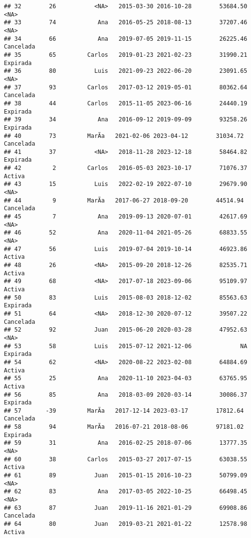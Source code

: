 \documentclass[
]{article}
\begin{document}
\begin{verbatim}
## 32        26           <NA>   2015-03-30 2016-10-28        53684.50      <NA>
## 33        74            Ana   2016-05-25 2018-08-13        37207.46      <NA>
## 34        66            Ana   2019-07-05 2019-11-15        26225.46 Cancelada
## 35        65         Carlos   2019-01-23 2021-02-23        31990.21  Expirada
## 36        80           Luis   2021-09-23 2022-06-20        23091.65      <NA>
## 37        93         Carlos   2017-03-12 2019-05-01        80362.64 Cancelada
## 38        44         Carlos   2015-11-05 2023-06-16        24440.19  Expirada
## 39        34            Ana   2016-09-12 2019-09-09        93258.26  Expirada
## 40        73         MarÃ­a   2021-02-06 2023-04-12        31034.72 Cancelada
## 41        37           <NA>   2018-11-28 2023-12-18        58464.82  Expirada
## 42         2         Carlos   2016-05-03 2023-10-17        71076.37    Activa
## 43        15           Luis   2022-02-19 2022-07-10        29679.90      <NA>
## 44         9         MarÃ­a   2017-06-27 2018-09-20        44514.94 Cancelada
## 45         7            Ana   2019-09-13 2020-07-01        42617.69      <NA>
## 46        52            Ana   2020-11-04 2021-05-26        68833.55      <NA>
## 47        56           Luis   2019-07-04 2019-10-14        46923.86    Activa
## 48        26           <NA>   2015-09-20 2018-12-26        82535.71    Activa
## 49        68           <NA>   2017-07-18 2023-09-06        95109.97    Activa
## 50        83           Luis   2015-08-03 2018-12-02        85563.63  Expirada
## 51        64           <NA>   2018-12-30 2020-07-12        39507.22 Cancelada
## 52        92           Juan   2015-06-20 2020-03-28        47952.63      <NA>
## 53        58           Luis   2015-07-12 2021-12-06              NA  Expirada
## 54        62           <NA>   2020-08-22 2023-02-08        64884.69    Activa
## 55        25            Ana   2020-11-10 2023-04-03        63765.95    Activa
## 56        85            Ana   2018-03-09 2020-03-14        30086.37  Expirada
## 57       -39         MarÃ­a   2017-12-14 2023-03-17        17812.64 Cancelada
## 58        94         MarÃ­a   2016-07-21 2018-08-06        97181.02  Expirada
## 59        31            Ana   2016-02-25 2018-07-06        13777.35      <NA>
## 60        38         Carlos   2015-03-27 2017-07-15        63038.55    Activa
## 61        89           Juan   2015-01-15 2016-10-23        50799.09      <NA>
## 62        83            Ana   2017-03-05 2022-10-25        66498.45      <NA>
## 63        87           Juan   2019-11-16 2021-01-29        69908.86 Cancelada
## 64        80           Juan   2019-03-21 2021-01-22        12578.98    Activa

\end{verbatim}
\end{document}
